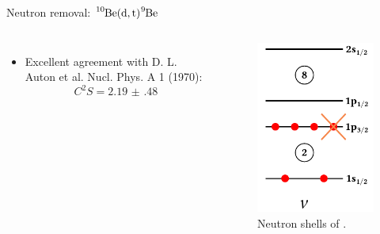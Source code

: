 \documentclass[sans,
frameno, %
mp,
usenames,dvipsnames, %
onlytextwidth, %
t,%
11pt]{beamer}
\newcommand{\iso}[2]{\ce{^{#1}#2}}
\begin{document}
\begin{frame}{Neutron removal: $\iso{10}{Be}(\textrm{d}, \textrm{t})\iso{9}{Be}$}
{\begin{columns}[c]
{\begin{itemize}
\begin{itemize}
                          \end{itemize}
                    \item Excellent agreement with {\small D. L. Auton et al. Nucl. Phys. A 1 (1970)}:
                          $$C^2S = \qty{2.19(48)}{}$$
                \end{itemize}
            }\hfill
            {
                \begin{figure}
                    \centering
                    \includegraphics[width=0.8\linewidth]{figures/neutron_shell_model_9Be.pdf}
                    \caption{Neutron shells of \iso{10}{Be}.}
                \end{figure}
            }
        \end{columns}
    }
\end{frame}
\end{document}
